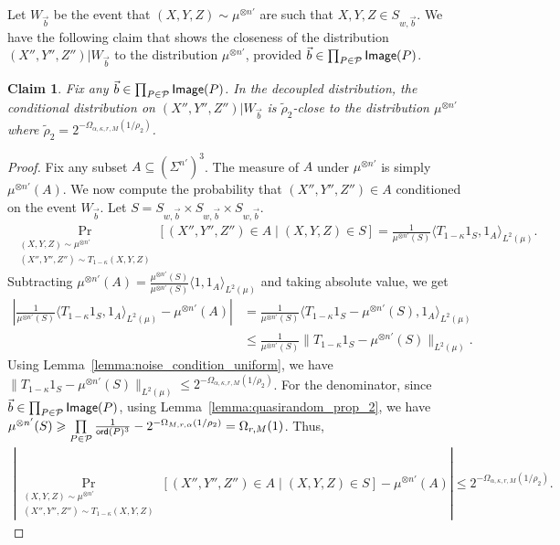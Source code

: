 \documentclass[10pt,a4paper]{amsart}
\newtheorem{claim}[thm]{Claim}
\newcommand\card[1]{\left| {#1} \right|}
\newcommand\norm[1]{\| #1 \|}
\renewcommand\geq{\geqslant}
\renewcommand\leq{\leqslant}
\newcommand{\V}[1]{{#1}}
\begin{document}
Let $W_{\vec{b}}$ be the event that $(X, Y, Z)\sim \mu^{\otimes n'}$ are such that $X, Y, Z\in S_{\V w, \vec{b}}$. We have the following claim that shows the closeness of the distribution $(X'', Y'', Z'')|W_{\vec{b}}$ to the distribution $\mu^{\otimes n'}$, provided $\vec{b} \in \prod_{P\in \mathcal{P}} {\sf Image}(P)$.
\begin{claim}\label{claim:closeness}
Fix any $\vec{b}\in  \prod_{P\in \mathcal{P}} {\sf Image}(P)$. In the decoupled distribution, the conditional distribution on $(X'', Y'', Z'')|W_{\vec{b}}$ is $\tilde{\rho}_2$-close to the distribution $\mu^{\otimes n'}$ where $\tilde{\rho}_2 =  2^{-\Omega_{\alpha, \kappa, r, M}(1/\rho_2)}$.
\end{claim}
\begin{proof}
    Fix any subset $A\subseteq (\Sigma^{n'})^3$. The measure of $A$ under $\mu^{\otimes n'}$ is simply $\mu^{\otimes n'}(A)$. We now compute the probability that  $(X'', Y'', Z'')\in A$ conditioned on the event $W_{\vec{b}}$. Let $S = S_{\V w, \vec{b}} \times S_{\V w, \vec{b}}\times S_{\V w, \vec{b}}$.
    \begin{align*}
        \Pr_{\substack{(X, Y, Z)\sim \mu^{\otimes n'}\\ (X'', Y'', Z'')\sim T_{1-\kappa}(X, Y, Z)}}\left[(X'', Y'', Z'')\in A \mid (X, Y, Z) \in S\right] = \frac{1}{\mu^{\otimes n'}(S)} \langle T_{1-\kappa}1_S, 1_A \rangle_{L^2(\mu)}.
    \end{align*}
    Subtracting $\mu^{\otimes n'}(A) = \frac{\mu^{\otimes n'}(S)}{\mu^{\otimes n'}(S)} \langle1, 1_A \rangle_{L^2(\mu)}$ and taking absolute value, we get
    \begin{align*}
        \card{\frac{1}{\mu^{\otimes n'}(S)} \langle T_{1-\kappa}1_S, 1_A \rangle_{L^2(\mu)} - \mu^{\otimes n'}(A)} &= \frac{1}{\mu^{\otimes n'}(S)}\langle T_{1-\kappa}1_S -\mu^{\otimes n'}(S) , 1_A\rangle_{L^2(\mu)}\\
        &\leq \frac{1}{\mu^{\otimes n'}(S)}\norm{T_{1-\kappa}1_S -\mu^{\otimes n'}(S)}_{L^2(\mu)}.
    \end{align*}
    Using Lemma~\ref{lemma:noise_condition_uniform}, we have $\norm{T_{1-\kappa}1_S -\mu^{\otimes n'}(S)}_{L^2(\mu)}\leq 2^{-\Omega_{\alpha, \kappa, r, M}(1/\rho_2)}$. For the denominator, since $\vec{b}\in  \prod_{P\in \mathcal{P}} {\sf Image}(P)$, using Lemma~\ref{lemma:quasirandom_prop_2}, we have $\mu^{\otimes n'}(S) \geq \prod\limits_{P\in\mathcal{P}}\frac{1}{{\sf ord}(P)^3}-2^{-\Omega_{M,r,\alpha}(1/\rho_2)} = \Omega_{r, M}(1)$. Thus,
     \begin{align*}
        \card{\Pr_{\substack{(X, Y, Z)\sim \mu^{\otimes n'}\\ (X'', Y'', Z'')\sim T_{1-\kappa}(X, Y, Z)}}\left[(X'', Y'', Z'')\in A \mid (X, Y, Z) \in S\right] - \mu^{\otimes n'}(A)} \leq  2^{-\Omega_{\alpha, \kappa, r, M}(1/\rho_2)}.
    \end{align*}
\end{proof}
\end{document}
